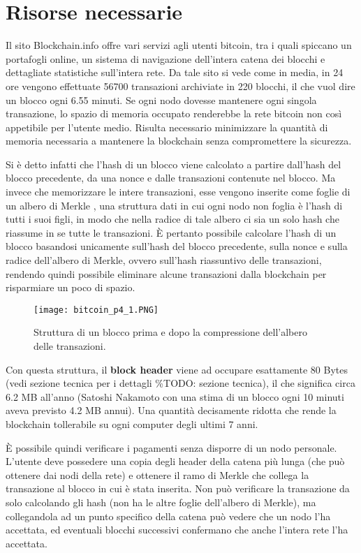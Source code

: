 \section{Risorse necessarie}\label{risorse-necessarie}

Il sito Blockchain.info \cite{blockchain-info} offre vari servizi agli
utenti bitcoin, tra i quali spiccano un portafogli online, un sistema di
navigazione dell'intera catena dei blocchi e dettagliate statistiche
sull'intera rete. Da tale sito si vede come in media, in 24 ore vengono
effettuate 56700 transazioni archiviate in 220 blocchi, il che vuol dire
un blocco ogni 6.55 minuti. Se ogni nodo dovesse mantenere ogni singola
transazione, lo spazio di memoria occupato renderebbe la rete bitcoin
non così appetibile per l'utente medio. Risulta necessario minimizzare
la quantità di memoria necessaria a mantenere la blockchain senza
compromettere la sicurezza.

Si è detto infatti che l'hash di un blocco viene calcolato a partire
dall'hash del blocco precedente, da una nonce e dalle transazioni
contenute nel blocco. Ma invece che memorizzare le intere transazioni,
esse vengono inserite come foglie di un albero di Merkle \cite{merkle},
una struttura dati in cui ogni nodo non foglia è l'hash di tutti i suoi
figli, in modo che nella radice di tale albero ci sia un solo hash che
riassume in se tutte le transazioni. È pertanto possibile calcolare
l'hash di un blocco basandosi unicamente sull'hash del blocco
precedente, sulla nonce e sulla radice dell'albero di Merkle, ovvero
sull'hash riassuntivo delle transazioni, rendendo quindi possibile
eliminare alcune transazioni dalla blockchain per risparmiare un poco di
spazio.

\begin{figure}[htbp]
\centering
\texttt{[image: bitcoin\_p4\_1.PNG]}
\caption{Struttura di un blocco prima e dopo la compressione dell'albero
delle transazioni.\label{bitcoin_p4_1}}
\end{figure}

Con questa struttura, il \textbf{block header} viene ad occupare
esattamente 80 Bytes (vedi sezione tecnica per i dettagli \%TODO:
sezione tecnica), il che significa circa 6.2 MB all'anno (Satoshi
Nakamoto con una stima di un blocco ogni 10 minuti aveva previsto 4.2 MB
annui). Una quantità decisamente ridotta che rende la blockchain
tollerabile su ogni computer degli ultimi 7 anni.

È possibile quindi verificare i pagamenti senza disporre di un nodo
personale. L'utente deve possedere una copia degli header della catena
più lunga (che può ottenere dai nodi della rete) e ottenere il ramo di
Merkle che collega la transazione al blocco in cui è stata inserita. Non
può verificare la transazione da solo calcolando gli hash (non ha le
altre foglie dell'albero di Merkle), ma collegandola ad un punto
specifico della catena può vedere che un nodo l'ha accettata, ed
eventuali blocchi successivi confermano che anche l'intera rete l'ha
accettata.

